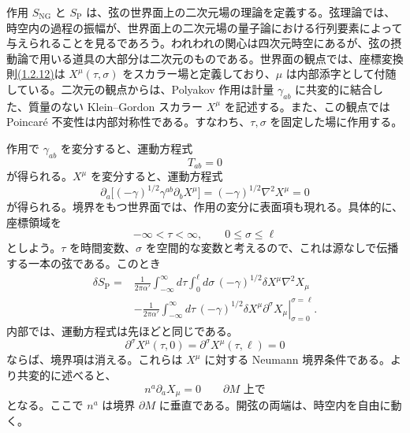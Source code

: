 作用 $S_{\mathrm{NG}}$ と $S_{\mathrm P}$ は、弦の世界面上の二次元場の理論を定義する。弦理論では、時空内の過程の振幅が、世界面上の二次元場の量子論における行列要素によって与えられることを見るであろう。われわれの関心は四次元時空にあるが、弦の摂動論で用いる道具の大部分は二次元のものである。世界面の観点では、座標変換則\hyperref[eq:1.2.12]{(1.2.12)}は $X^\mu(\tau,\sigma)$ をスカラー場と定義しており、$\mu$ は内部添字として付随している。二次元の観点からは、Polyakov 作用は計量 $\gamma_{ab}$ に共変的に結合した、質量のない Klein--Gordon スカラー $X^\mu$ を記述する。また、この観点では Poincaré 不変性は内部対称性である。すなわち、$\tau,\sigma$ を固定した場に作用する。

作用で $\gamma_{ab}$ を変分すると、運動方程式
\begin{equation}
T_{ab}=0
\tag{1.2.24}\label{eq:1.2.24}
\end{equation}
が得られる。$X^\mu$ を変分すると、運動方程式
\begin{equation}
\partial_a\bigl[(-\gamma)^{1/2}\gamma^{ab}\partial_bX^\mu\bigr]
=(-\gamma)^{1/2}\nabla^2X^\mu=0
\tag{1.2.25}\label{eq:1.2.25}
\end{equation}
が得られる。境界をもつ世界面では、作用の変分に表面項も現れる。具体的に、座標領域を
\begin{equation}
-\infty<\tau<\infty,\qquad 0\leq\sigma\leq\ell
\tag{1.2.26}\label{eq:1.2.26}
\end{equation}
としよう。$\tau$ を時間変数、$\sigma$ を空間的な変数と考えるので、これは源なしで伝播する一本の弦である。このとき
\begin{equation}
\begin{aligned}
\delta S_{\mathrm P}
={}&\frac{1}{2\pi\alpha'}\int_{-\infty}^{\infty}d\tau
\int_0^\ell d\sigma\,(-\gamma)^{1/2}\delta X^\mu\nabla^2X_\mu\\
&-\frac{1}{2\pi\alpha'}\int_{-\infty}^{\infty}d\tau\,
\left.(-\gamma)^{1/2}\delta X^\mu\partial^\sigma X_\mu
\right|_{\sigma=0}^{\sigma=\ell}.
\end{aligned}
\tag{1.2.27}\label{eq:1.2.27}
\end{equation}
内部では、運動方程式は先ほどと同じである。
\begin{equation}
\partial^\sigma X^\mu(\tau,0)=\partial^\sigma X^\mu(\tau,\ell)=0
\tag{1.2.28}\label{eq:1.2.28}
\end{equation}
ならば、境界項は消える。これらは $X^\mu$ に対する Neumann 境界条件である。より共変的に述べると、
\begin{equation}
n^a\partial_aX_\mu=0\qquad \text{$\partial M$ 上で}
\tag{1.2.29}\label{eq:1.2.29}
\end{equation}
となる。ここで $n^a$ は境界 $\partial M$ に垂直である。開弦の両端は、時空内を自由に動く。

